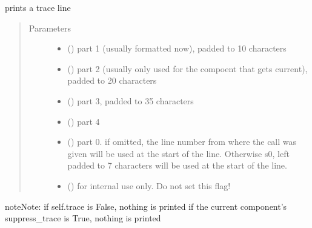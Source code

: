 \documentclass[letterpaper,10pt,english]{sphinxmanual}
\begin{document}
\begin{fulllineitems}

\begin{fulllineitems}
\label{\detokenize{Reference:salabim.Environment.print_trace}}
prints a trace line
\begin{quote}\begin{description}
\item[{Parameters}] \leavevmode\begin{itemize}
\item {} 
 () \textendash{} part 1 (usually formatted  now), padded to 10 characters

\item {} 
 () \textendash{} part 2 (usually only used for the compoent that gets current), padded to 20 characters

\item {} 
 () \textendash{} part 3, padded to 35 characters

\item {} 
 () \textendash{} part 4

\item {} 
 () \textendash{} part 0. if omitted, the line number from where the call was given will be used at
the start of the line. Otherwise s0, left padded to 7 characters will be used at
the start of the line.

\item {} 
 () \textendash{} for internal use only. Do not set this flag!

\end{itemize}

\end{description}\end{quote}

\begin{sphinxadmonition}{note}{Note:}
if self.trace is False, nothing is printed 
if the current component’s suppress\_trace is True, nothing is printed 
\end{sphinxadmonition}


\end{fulllineitems}
\end{fulllineitems}
\end{document}
